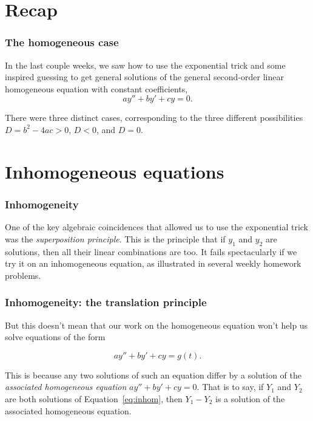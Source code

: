 \def\encoding{UTF-8}

\def\mytitle{Undetermined Coefficients,I}
\def\subtitle{Guess-and-check: expert level}
\def\affiliation{The College of Idaho}
\def\myauthor{Math 352 Differential Equations}
\def\mydate{1 April 2013}
\def\latexmode{beamer}
\def\fonttheme{structurebold}
\def\colortheme{crane}
\def\theme{Szeged}

\def\htmlheaderlevel{2}
\section{Recap}
\label{recap}

\begin{frame}

\frametitle{The homogeneous case}
\label{thehomogeneouscase}

In the last couple weeks, we saw how to use the exponential trick and some inspired guessing to get general solutions of the general second-order linear homogeneous equation with constant coefficients,
\[ ay'' + by' + cy = 0. \]

There were three distinct cases, corresponding to the three different possibilities $ D = b^2 - 4ac > 0 $, $ D < 0 $, and $ D = 0 $.

\end{frame}

\section{Inhomogeneous equations}
\label{inhomogeneous equations}

\begin{frame}

\frametitle{Inhomogeneity}
\label{inhomogeneity}

One of the key algebraic coincidences that allowed us to use the exponential trick was the \emph{superposition principle}. This is the principle that if $ y_1 $ and $ y_2 $ are solutions, then all their linear combinations are too. It fails spectacularly if we try it on an inhomogeneous equation, as illustrated in several weekly homework problems.

\end{frame}

\begin{frame}

\frametitle{Inhomogeneity: the translation principle}
\label{inhomogeneity:thetranslationprinciple}

But this doesn't mean that our work on the homogeneous equation won't help us solve equations of the form

\begin{equation} \label{eq:inhom}
ay'' + by' + cy = g(t).
\end{equation}

This is because any two solutions of such an equation differ by a solution of the \emph{associated homogeneous equation} $ ay'' + by' + cy = 0 $. That is to say, if $ Y_1 $ and $ Y_2 $ are both solutions of Equation~\ref{eq:inhom}, then $ Y_1 - Y_2 $ is a solution of the associated homogeneous equation.

\end{frame}

